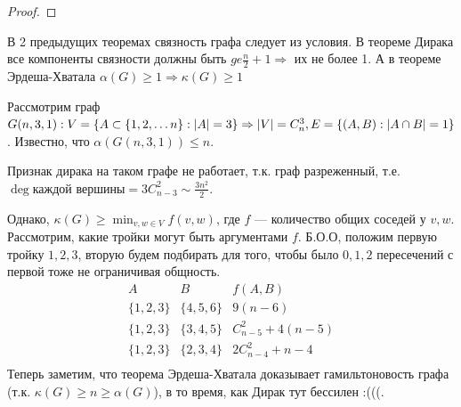 \begin{proof}
\end{proof}

\begin{note}
    В 2 предыдущих теоремах связность графа следует из условия. В теореме Дирака все компоненты связности должны быть \(ge \frac{n}{2} + 1 \Longrightarrow \) их не более 1. А в теореме Эрдеша-Хватала \(\alpha(G) \ge 1 \Longrightarrow \kappa(G) \ge 1\)
\end{note}

\begin{example}
    Рассмотрим граф \(G(n, 3, 1): V = \{A \subset \{1, 2, \dots n\}: |A| = 3\} \Rightarrow |V| = C_n^3, E = \{(A, B): |A \cap B| = 1\}\). Известно, что \(\alpha(G(n, 3, 1)) \le n\).

    Признак дирака на таком графе не работает, т.к. граф разреженный, т.е. \(\deg \text{каждой вершины} = 3C_{n - 3}^2 \sim \frac{3n^2}{2}\).

    Однако, \(\kappa(G) \ge \min_{v, w \in V} f(v, w)\), где \(f\) --- количество общих соседей у \(v, w\). Рассмотрим, какие тройки могут быть аргументами \(f\). Б.О.О, положим первую тройку \(1, 2, 3\), вторую будем подбирать для того, чтобы было \(0, 1, 2\) пересечений с первой тоже не ограничивая общность.
    \[\begin{array}{c|c|c}
        A & B & f(A, B) \\
        \hline
        \{1, 2, 3\} & \{4, 5, 6\} & 9(n - 6) \\ 
        \{1, 2, 3\} & \{3, 4, 5\} & C_{n - 5}^2 + 4(n - 5) \\ 
        \{1, 2, 3\} & \{2, 3, 4\} & 2C_{n - 4}^2 + n - 4 \\ 
    \end{array}\]
    Теперь заметим, что теорема Эрдеша-Хватала доказывает гамильтоновость графа (т.к. \(\kappa(G) \ge n \ge \alpha(G)\)), в то время, как Дирак тут бессилен :(((.
\end{example}

